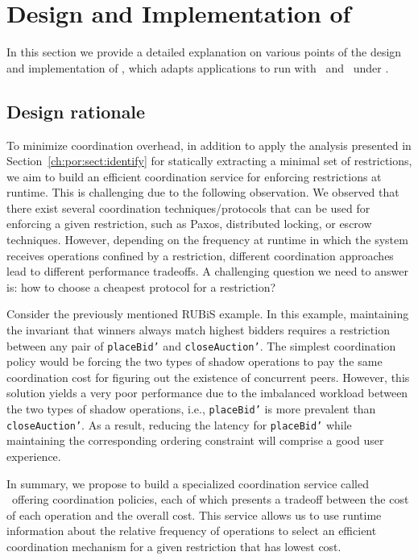 \clearpage
\section{Design and Implementation of \coordtool}
\label{ch:por:sect:coord}
In this section we provide a detailed explanation on various points of the design
and implementation of \coordtool, which adapts applications to run with \tool\
and \gemini\ under \PRCN.

\subsection{Design rationale}

To minimize coordination overhead, in addition to apply the analysis presented 
in Section~\ref{ch:por:sect:identify} for statically extracting a minimal set 
of restrictions, we aim to build an efficient coordination service for enforcing
restrictions at runtime. This is challenging due to the following observation.
We observed that there exist several coordination techniques/protocols that can be used
for enforcing a given restriction, such as Paxos, distributed locking, or escrow techniques. However, depending on the
frequency at runtime in which the system receives operations confined by a restriction, different coordination approaches 
lead to different performance tradeoffs. A challenging question
we need to answer is: how to choose a cheapest protocol for a restriction?

Consider the previously mentioned RUBiS example. In this example,
maintaining the invariant that winners always match highest 
bidders requires a restriction between any pair of {\tt placeBid'}
and {\tt closeAuction'}. The simplest coordination policy would be forcing the two types of shadow operations to pay the same coordination
cost for figuring out the existence of concurrent peers. However, this solution yields a very poor performance due to the imbalanced workload
between the two types of shadow operations, i.e., {\tt placeBid'} is more prevalent than {\tt closeAuction'}. As a result, reducing the latency for 
{\tt placeBid'} while maintaining the corresponding ordering constraint will comprise
a good user experience. 

In summary, we propose to build a specialized coordination service called \coordtool\ offering
coordination policies, each of which presents a tradeoff between the cost of each operation and 
the overall cost. This service allows us to use runtime information about the relative frequency of operations
to select an efficient coordination mechanism for a given restriction that has lowest cost. 

